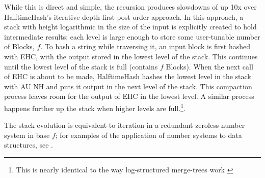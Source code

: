 \documentclass[sigconf, nonacm]{acmart}
\begin{document}
While this is direct and simple, the recursion produces slowdowns of up 10x over HalftimeHash's iterative depth-first post-order approach.
In this approach, a stack with height logarithmic in the size of the input is explicitly created to hold intermediate results; each level is large enough to store some user-tunable number of Blocks, $f$.
To hash a string while traversing it, an input block is first hashed with EHC, with the output stored in the lowest level of the stack.
This continues until the lowest level of the stack is full (contains $f$ Blocks).
When the next call of EHC is about to be made, HalftimeHash hashes the lowest level in the stack with AU NH and puts it output in the next level of the stack.
This compaction process leaves room for the output of EHC in the lowest level.
A similar process happens further up the stack when higher levels are full.\footnote{This is nearly identical to the way log-structured merge-trees work \cite{lsm-survey}}.

The stack evolution is equivalent to iteration in a redundant zeroless number system in base $f$; for examples of the application of number systems to data structures, see \cite{redundant-zeroless}.



\end{document}
